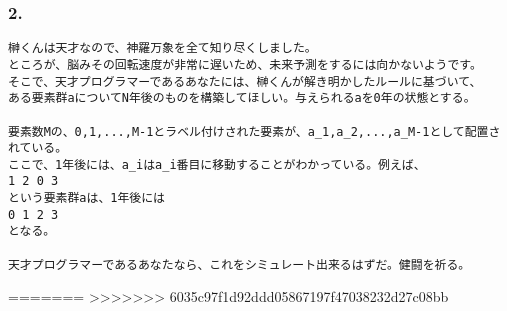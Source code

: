 \subsubsection{2.}
\begin{verbatim}
榊くんは天才なので、神羅万象を全て知り尽くしました。
ところが、脳みその回転速度が非常に遅いため、未来予測をするには向かないようです。
そこで、天才プログラマーであるあなたには、榊くんが解き明かしたルールに基づいて、
ある要素群aについてN年後のものを構築してほしい。与えられるaを0年の状態とする。

要素数Mの、0,1,...,M-1とラベル付けされた要素が、a_1,a_2,...,a_M-1として配置されている。
ここで、1年後には、a_iはa_i番目に移動することがわかっている。例えば、
1 2 0 3
という要素群aは、1年後には
0 1 2 3
となる。

天才プログラマーであるあなたなら、これをシミュレート出来るはずだ。健闘を祈る。
\end{verbatim}










=======
>>>>>>> 6035c97f1d92ddd05867197f47038232d27c08bb
